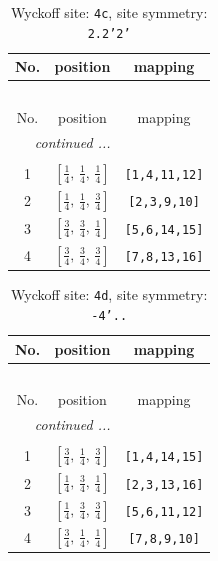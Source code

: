 \documentclass[fleqn,8pt]{jsarticle}
\begin{document}
\renewcommand{\arraystretch}{1.2}
\begin{longtable}{ccc}
\caption{Wyckoff site: {\tt 4c}, site symmetry: {\tt 2.2'2'}}
 \\
 \hline \hline
No. & position & mapping \\ \hline \endfirsthead

\multicolumn{2}{l}{\tablename\ \thetable{}} \\
 \hline \hline
No. & position & mapping \\ \hline \endhead

 \hline \hline
\multicolumn{2}{r}{\footnotesize\it continued ...} \\ \endfoot

 \hline \hline
\multicolumn{2}{r}{} \\ \endlastfoot

1 & $\left[ \frac{1}{4},\, \frac{1}{4},\, \frac{1}{4} \right]$ & {\tt [1,4,11,12]} \\ \hline
2 & $\left[ \frac{1}{4},\, \frac{1}{4},\, \frac{3}{4} \right]$ & {\tt [2,3,9,10]} \\ \hline
3 & $\left[ \frac{3}{4},\, \frac{3}{4},\, \frac{1}{4} \right]$ & {\tt [5,6,14,15]} \\ \hline
4 & $\left[ \frac{3}{4},\, \frac{3}{4},\, \frac{3}{4} \right]$ & {\tt [7,8,13,16]} \\
\end{longtable}
\renewcommand{\arraystretch}{1.2}
\begin{longtable}{ccc}
\caption{Wyckoff site: {\tt 4d}, site symmetry: {\tt -4'..}}
 \\
 \hline \hline
No. & position & mapping \\ \hline \endfirsthead

\multicolumn{2}{l}{\tablename\ \thetable{}} \\
 \hline \hline
No. & position & mapping \\ \hline \endhead

 \hline \hline
\multicolumn{2}{r}{\footnotesize\it continued ...} \\ \endfoot

 \hline \hline
\multicolumn{2}{r}{} \\ \endlastfoot

1 & $\left[ \frac{3}{4},\, \frac{1}{4},\, \frac{3}{4} \right]$ & {\tt [1,4,14,15]} \\ \hline
2 & $\left[ \frac{1}{4},\, \frac{3}{4},\, \frac{1}{4} \right]$ & {\tt [2,3,13,16]} \\ \hline
3 & $\left[ \frac{1}{4},\, \frac{3}{4},\, \frac{3}{4} \right]$ & {\tt [5,6,11,12]} \\ \hline
4 & $\left[ \frac{3}{4},\, \frac{1}{4},\, \frac{1}{4} \right]$ & {\tt [7,8,9,10]} \\
\end{longtable}
\end{document}
